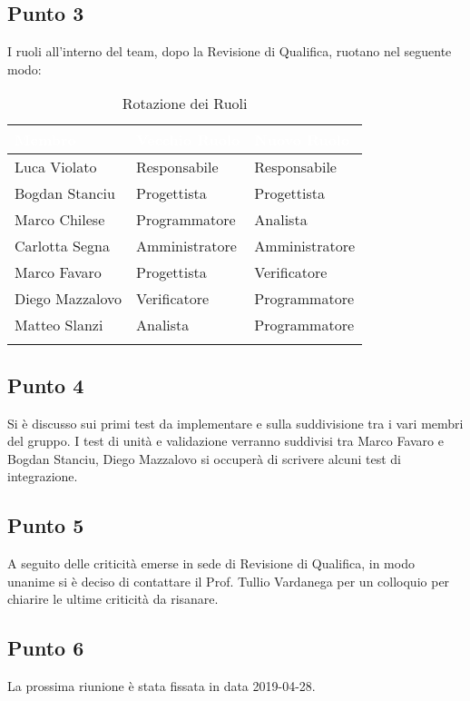 \subsection{Punto 3}
I ruoli all'interno del team, dopo la Revisione di Qualifica, ruotano nel seguente modo:\\

\begin{center}
	\begin{longtable}[c]{|m{}|m{}|m{}|} 
		\hline
		\rowcolor{bluelogo}\textbf{\textcolor{white}{Membro}} & \textbf{\textcolor{white}{Vecchio Ruolo}} & \textbf{\textcolor{white}{Nuovo Ruolo}}\\
		\hline
		\hline
		Luca Violato & Responsabile & Responsabile \\
		\hline
		\rowcolor{grigio}Bogdan Stanciu & Progettista & Progettista \\
		\hline
		Marco Chilese & Programmatore & Analista\\
		\hline
		\rowcolor{grigio}Carlotta Segna & Amministratore & Amministratore\\
		\hline
		Marco Favaro & Progettista & Verificatore \\
		\hline
		\rowcolor{grigio} Diego Mazzalovo & Verificatore & Programmatore\\
		\hline
		Matteo Slanzi & Analista & Programmatore\\
		\hline
		\caption{Rotazione dei Ruoli}
	\end{longtable}

\end{center}

\subsection{Punto 4}
Si è discusso sui primi test da implementare e sulla suddivisione tra i vari membri del gruppo. 
I test di unità e validazione verranno suddivisi tra Marco Favaro e Bogdan Stanciu, Diego Mazzalovo si occuperà di scrivere alcuni test di integrazione.
	
\subsection{Punto 5}
A seguito delle criticità emerse in sede di Revisione di Qualifica, in modo unanime si è deciso di contattare il Prof. Tullio Vardanega per un colloquio per chiarire le ultime criticità da risanare.

\subsection{Punto 6}
La prossima riunione è stata fissata in data 2019-04-28.